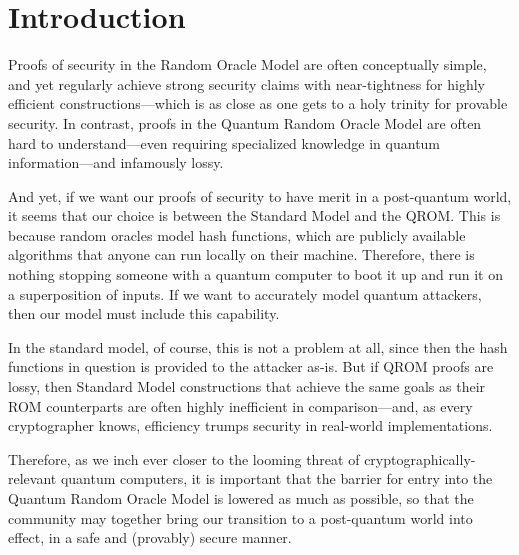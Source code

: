 \section{Introduction}

  Proofs of security in the Random Oracle Model are often conceptually
    simple, and yet regularly achieve strong security claims with
    near-tightness for highly efficient constructions---which is as close as
    one gets to a holy trinity for provable security. In contrast, proofs in the
    Quantum Random Oracle Model are often hard to understand---even requiring
    specialized knowledge in quantum information---and infamously lossy.

  And yet, if we want our proofs of security to have merit in a post-quantum
    world, it seems that our choice is between the Standard Model and the
    QROM. This is because random oracles model hash functions, which are
    publicly available algorithms that anyone can run locally on their machine.
    Therefore, there is nothing stopping someone with a quantum computer to
    boot it up and run it on a superposition of inputs. If we want to
    accurately model quantum attackers, then our model must include this
    capability. 

  In the standard model, of course, this is not a problem at all,
    since then the hash functions in question is provided to the attacker
    as-is.  But if QROM proofs are lossy, then Standard Model constructions
    that achieve the same goals as their ROM counterparts are often highly
    inefficient in comparison---and, as every cryptographer knows, efficiency
    trumps security in real-world implementations.

  Therefore, as we inch ever closer to the looming threat of
    cryptographically-relevant quantum computers, it is important that the
    barrier for entry into the Quantum Random Oracle Model is lowered as much as
    possible, so that the community may together bring our transition to a
    post-quantum world into effect, in a safe and (provably) secure manner.


